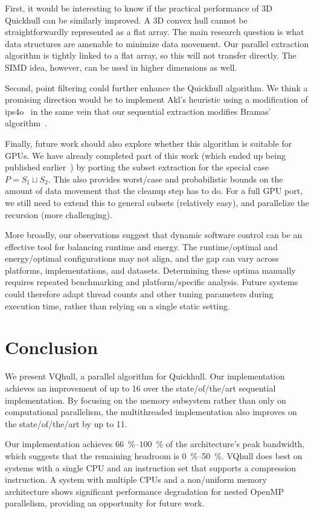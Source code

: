 \documentclass[11pt,a4paper]{article}
\begin{document}
First, it would be interesting to know if the practical performance of 3D Quickhull can be similarly improved.
A 3D convex hull cannot be straightforwardly represented as a flat array.
The main research question is what data structures are amenable to minimize data movement.
Our parallel extraction algorithm is tightly linked to a flat array, so this will not transfer directly.
The SIMD idea, however, can be used in higher dimensions as well.

Second, point filtering could further enhance the Quickhull algorithm.
We think a promising direction would be to implement Akl's heuristic using a modification of ips4o~\cite{axtmann2017inplace} in the same vein that our sequential extraction modifies Bramas' algorithm~\cite{bramas2017novel}.

Finally, future work should also explore whether this algorithm is suitable for GPUs.
We have already completed part of this work (which ended up being published earlier~\cite{koopman2025partitioning}) by porting the subset extraction for the special case $P = S_1 \sqcup S_2$.
This also provides worst\-/case and probabilistic bounds on the amount of data movement that the cleanup step has to do.
For a full GPU port, we still need to extend this to general subsets (relatively easy), and parallelize the recursion (more challenging).

More broadly, our observations suggest that dynamic software control can be an effective tool for balancing runtime and energy.
The runtime\-/optimal and energy\-/optimal configurations may not align, and the gap can vary across platforms, implementations, and datasets.
Determining these optima manually requires repeated benchmarking and platform\-/specific analysis.
Future systems could therefore adapt thread counts and other tuning parameters during execution time, rather than relying on a single static setting.

\section{Conclusion}
We present VQhull, a parallel algorithm for Quickhull.
Our implementation achieves an improvement of up to \qty{16}{\times} over the state\-/of\-/the\-/art sequential implementation.
By focusing on the memory subsystem rather than only on computational parallelism, the multithreaded implementation also improves on the state\-/of\-/the\-/art by up to \qty{11}{\times}.

Our implementation achieves \qtyrange{66}{100}{\percent} of the architecture's peak bandwidth, which suggests that the remaining headroom is \qtyrange{0}{50}{\percent}.
VQhull does best on systems with a single CPU and an instruction set that supports a compression instruction.
A system with multiple CPUs and a non\-/uniform memory architecture shows significant performance degradation for nested OpenMP parallelism, providing an opportunity for future work.
\end{document}
